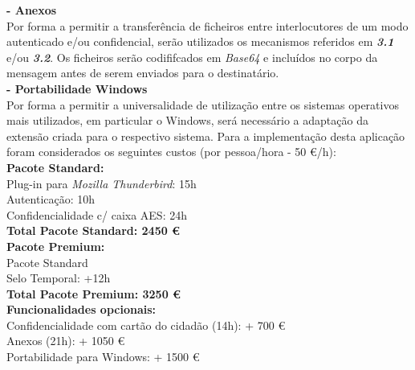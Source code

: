 \documentclass[times, 10pt,twocolumn]{article}
\begin{document}
\noindent \textbf{- Anexos}\\
\indent Por forma a permitir a transfer\^encia de ficheiros entre interlocutores de um modo autenticado e/ou confidencial, ser\~ao utilizados os mecanismos referidos em \emph{\textbf{3.1}} e/ou \emph{\textbf{3.2}}. Os ficheiros ser\~ao codififcados em \emph{Base64} e inclu\'idos no corpo da mensagem antes de serem enviados para o destinat\'ario.\\

\noindent \textbf{- Portabilidade Windows}\\
\indent Por forma a permitir a universalidade de utiliza\c{c}\~ao entre os sistemas operativos mais utilizados, em particular o Windows, ser\'a necess\'ario a adapta\c{c}\~ao da extens\~ao criada para o respectivo sistema.
Para a implementa\c{c}\~ao desta aplica\c{c}\~ao foram considerados os seguintes custos (por pessoa/hora - 50 \euro /h):\\

\textbf{Pacote Standard:} \\
\indent \indent Plug-in para \emph{Mozilla Thunderbird}: 15h\\
\indent \indent Autentica\c{c}\~ao: 10h \\
\indent \indent Confidencialidade c/ caixa AES: 24h \\

\textbf{Total Pacote Standard: 2450 \euro} \\

\textbf{Pacote Premium:} \\
 \indent \indent Pacote Standard\\
 \indent \indent Selo Temporal: +12h\\

\textbf{Total Pacote Premium: 3250 \euro} \\

\indent \textbf{Funcionalidades opcionais:}\\
\indent \indent Confidencialidade com cart\~ao do cidad\~ao (14h): + 700 \euro \\
\indent \indent Anexos (21h): + 1050 \euro \\
\indent \indent Portabilidade para Windows: + 1500 \euro 
\end{document}
